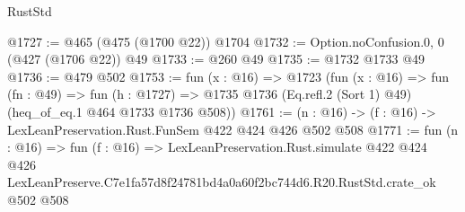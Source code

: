 \begin{lexlean}{RustStd}
\begin{coremodule}
@1727 := @465 (@475 (@1700 @22)) @1704
@1732 := Option.noConfusion.{0, 0} (@427 (@1706 @22)) @49
@1733 := @260 @49
@1735 := @1732 @1733 @49
@1736 := @479 @502
@1753 := fun (x : @16) =>
  @1723
    (fun (x : @16) =>
    fun (fn : @49) =>
    fun (h : @1727) => @1735 @1736 (Eq.refl.{2} (Sort 1) @49) (heq_of_eq.{1} @464 @1733 @1736 @508))
@1761 := (n : @16) -> (f : @16) -> LexLeanPreservation.Rust.FunSem @422 @424 @426 @502 @508
@1771 := fun (n : @16) =>
  fun (f : @16) =>
  LexLeanPreservation.Rust.simulate
    @422
    @424
    @426
    LexLeanPreserve.C7e1fa57d8f24781bd4a0a60f2bc744d6.R20.RustStd.crate_ok
    @502
    @508
\end{coremodule}
\end{lexlean}
